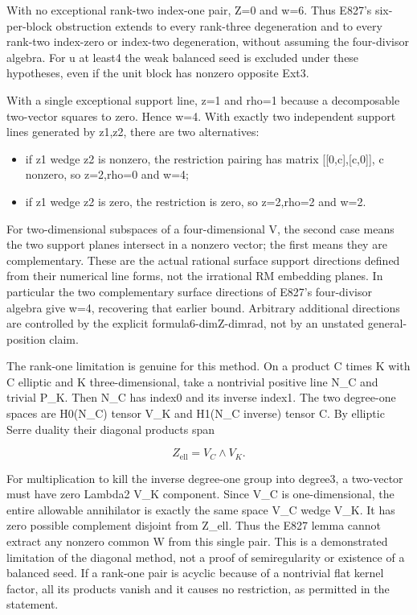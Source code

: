 With no exceptional rank-two index-one pair, Z=0 and w=6. Thus E827's
six-per-block obstruction extends to every rank-three degeneration and to
every rank-two index-zero or index-two degeneration, without assuming the
four-divisor algebra. For u at least4 the weak balanced seed is excluded
under these hypotheses, even if the unit block has nonzero opposite Ext3.

With a single exceptional support line, z=1 and rho=1 because a decomposable
two-vector squares to zero. Hence w=4. With exactly two independent support
lines generated by z1,z2, there are two alternatives:

\begin{itemize}
\tightlist
\item
  if z1 wedge z2 is nonzero, the restriction pairing has matrix
  {[}{[}0,c{]},{[}c,0{]}{]}, c nonzero, so z=2,rho=0 and w=4;
\item
  if z1 wedge z2 is zero, the restriction is zero, so z=2,rho=2 and w=2.
\end{itemize}

For two-dimensional subspaces of a four-dimensional V, the second case means
the two support planes intersect in a nonzero vector; the first means they
are complementary. These are the actual rational surface support directions
defined from their numerical line forms, not the irrational RM embedding
planes. In particular the two complementary surface directions of E827's
four-divisor algebra give w=4, recovering that earlier bound. Arbitrary
additional directions are controlled by the explicit formula6-dimZ-dimrad,
not by an unstated general-position claim.

The rank-one limitation is genuine for this method. On a product C times K
with C elliptic and K three-dimensional, take a nontrivial positive line
N\_C and trivial P\_K. Then N\_C has index0 and its inverse index1. The two
degree-one spaces are H0(N\_C) tensor V\_K and H1(N\_C inverse) tensor C. By
elliptic Serre duality their diagonal products span

\[
 Z_{\mathrm{ell}}=V_C\wedge V_K.
 \tag{E829.12}
\]

For multiplication to kill the inverse degree-one group into degree3, a
two-vector must have zero Lambda2 V\_K component. Since V\_C is
one-dimensional, the entire allowable annihilator is exactly the same space
V\_C wedge V\_K. It has zero possible complement disjoint from Z\_ell. Thus
the E827 lemma cannot extract any nonzero common W from this single pair.
This is a demonstrated limitation of the diagonal method, not a proof of
semiregularity or existence of a balanced seed. If a rank-one pair is
acyclic because of a nontrivial flat kernel factor, all its products vanish
and it causes no restriction, as permitted in the statement.

